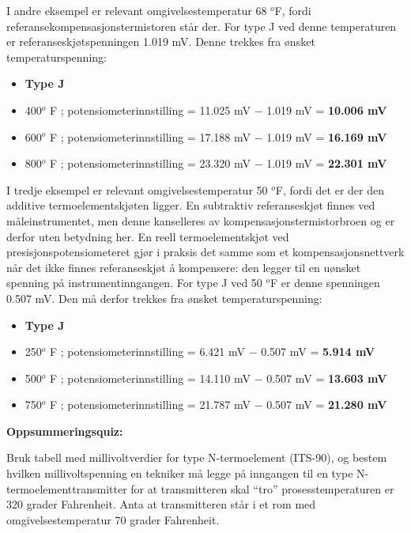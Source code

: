 \vskip 10pt

I andre eksempel er relevant omgivelsestemperatur 68 $^{o}$F, fordi referansekompensasjonstermistoren står der. For type J ved denne temperaturen er referanseskjøtspenningen 1.019 mV. Denne trekkes fra ønsket temperaturspenning:

\begin{itemize}
\item{} {\bf Type J}
\item{} 400$^{o}$ F ; potensiometerinnstilling = 11.025 mV $-$ 1.019 mV = {\bf 10.006 mV}
\item{} 600$^{o}$ F ; potensiometerinnstilling = 17.188 mV $-$ 1.019 mV = {\bf 16.169 mV}
\item{} 800$^{o}$ F ; potensiometerinnstilling = 23.320 mV $-$ 1.019 mV = {\bf 22.301 mV}
\end{itemize}

\vskip 10pt

I tredje eksempel er relevant omgivelsestemperatur 50 $^{o}$F, fordi det er der den additive termoelementskjøten ligger. En subtraktiv referanseskjøt finnes ved måleinstrumentet, men denne kanselleres av kompensasjonstermistorbroen og er derfor uten betydning her. En reell termoelementskjøt ved presisjonspotensiometeret gjør i praksis det samme som et kompensasjonsnettverk når det ikke finnes referanseskjøt å kompensere: den legger til en uønsket spenning på instrumentinngangen. For type J ved 50 $^{o}$F er denne spenningen 0.507 mV. Den må derfor trekkes fra ønsket temperaturspenning:

\begin{itemize}
\item{} {\bf Type J}
\item{} 250$^{o}$ F ; potensiometerinnstilling = 6.421 mV $-$ 0.507 mV = {\bf 5.914 mV}
\item{} 500$^{o}$ F ; potensiometerinnstilling = 14.110 mV $-$ 0.507 mV = {\bf 13.603 mV}
\item{} 750$^{o}$ F ; potensiometerinnstilling = 21.787 mV $-$ 0.507 mV = {\bf 21.280 mV}
\end{itemize}











\vfil \eject

\noindent
{\bf Oppsummeringsquiz:}

Bruk tabell med millivoltverdier for type N-termoelement (ITS-90), og bestem hvilken millivoltspenning en tekniker må legge på inngangen til en type N-termoelementtransmitter for at transmitteren skal ``tro'' prosesstemperaturen er 320 grader Fahrenheit. Anta at transmitteren står i et rom med omgivelsestemperatur 70 grader Fahrenheit.


